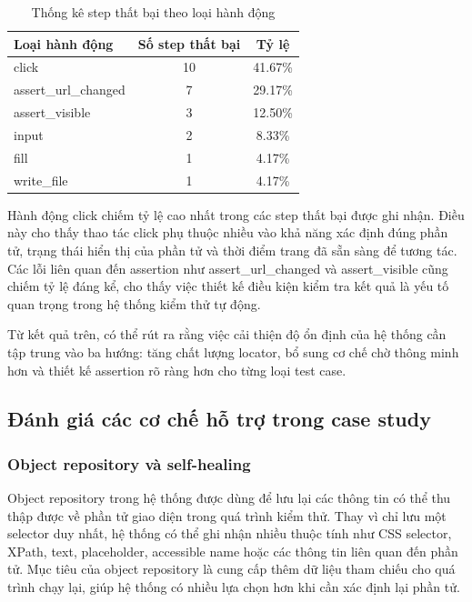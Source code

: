 \begin{table}[H]
\centering
\caption{Thống kê step thất bại theo loại hành động}
\label{tab:chapter6_step_failure_action}
\renewcommand{\arraystretch}{1.2}
\begin{tabular}{|p{6.0cm}|c|c|}
\hline
\textbf{Loại hành động} & \textbf{Số step thất bại} & \textbf{Tỷ lệ} \\
\hline
click & 10 & 41.67\% \\
\hline
assert\_url\_changed & 7 & 29.17\% \\
\hline
assert\_visible & 3 & 12.50\% \\
\hline
input & 2 & 8.33\% \\
\hline
fill & 1 & 4.17\% \\
\hline
write\_file & 1 & 4.17\% \\
\hline
\end{tabular}
\end{table}

Hành động click chiếm tỷ lệ cao nhất trong các step thất bại được ghi nhận. Điều này cho thấy thao tác click phụ thuộc nhiều vào khả năng xác định đúng phần tử, trạng thái hiển thị của phần tử và thời điểm trang đã sẵn sàng để tương tác. Các lỗi liên quan đến assertion như assert\_url\_changed và assert\_visible cũng chiếm tỷ lệ đáng kể, cho thấy việc thiết kế điều kiện kiểm tra kết quả là yếu tố quan trọng trong hệ thống kiểm thử tự động.

Từ kết quả trên, có thể rút ra rằng việc cải thiện độ ổn định của hệ thống cần tập trung vào ba hướng: tăng chất lượng locator, bổ sung cơ chế chờ thông minh hơn và thiết kế assertion rõ ràng hơn cho từng loại test case.

\subsection{Đánh giá các cơ chế hỗ trợ trong case study}

\subsubsection{Object repository và self-healing}

Object repository trong hệ thống được dùng để lưu lại các thông tin có thể thu thập được về phần tử giao diện trong quá trình kiểm thử. Thay vì chỉ lưu một selector duy nhất, hệ thống có thể ghi nhận nhiều thuộc tính như CSS selector, XPath, text, placeholder, accessible name hoặc các thông tin liên quan đến phần tử. Mục tiêu của object repository là cung cấp thêm dữ liệu tham chiếu cho quá trình chạy lại, giúp hệ thống có nhiều lựa chọn hơn khi cần xác định lại phần tử.

